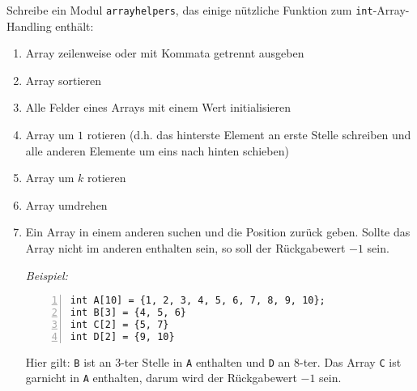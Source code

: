 \begin{aufg}
Schreibe ein Modul \verb|arrayhelpers|, das einige nützliche Funktion zum \verb|int|-Array-Handling enthält:
\begin{enumerate}
\item Array zeilenweise oder mit Kommata getrennt ausgeben
\item Array sortieren
\item Alle Felder eines Arrays mit einem Wert initialisieren
\item Array um $1$ rotieren (d.h. das hinterste Element an erste Stelle schreiben und alle anderen Elemente um eins nach hinten schieben)
\item Array um $k$ rotieren 
\item Array umdrehen
\item Ein Array in einem anderen suchen und die Position zurück geben. Sollte das Array nicht im anderen enthalten sein, so soll der Rückgabewert $-1$ sein.

\emph{Beispiel:} 
\begin{codelisting}
\begin{lstlisting}[numbers=left,numberstyle=\tiny,frame=tlrb]
int A[10] = {1, 2, 3, 4, 5, 6, 7, 8, 9, 10};
int B[3] = {4, 5, 6}
int C[2] = {5, 7}
int D[2] = {9, 10}
\end{lstlisting}
\end{codelisting}
Hier gilt: \verb|B| ist an $3$-ter Stelle in \verb|A| enthalten und \verb|D| an $8$-ter. Das Array \verb|C| ist garnicht in \verb|A| enthalten, darum wird der Rückgabewert $-1$ sein.

\end{enumerate}
\end{aufg}
